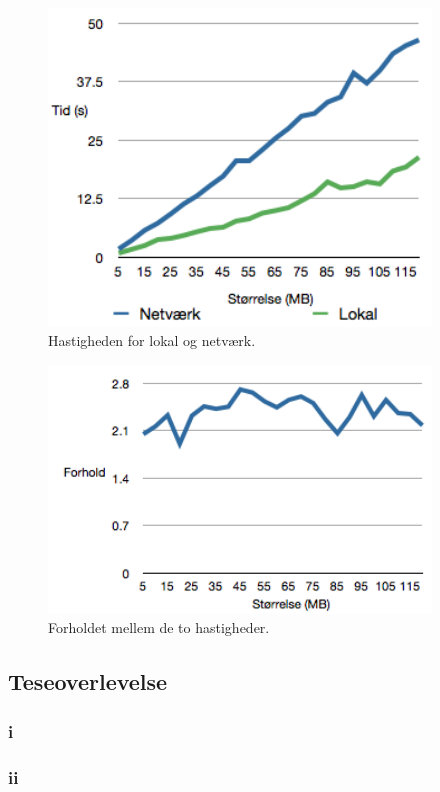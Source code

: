 \documentclass{article}
\begin{document}
\begin{figure}
	\includegraphics[width=4in]{ploto.png}
	\caption{Hastigheden for lokal og netværk.}
	\label{ploto}
\end{figure}

\begin{figure}
	\includegraphics[width=4in]{plotforhold.png}
	\caption{Forholdet mellem de to hastigheder.}
	\label{plotforhold}
\end{figure}

\subsection{Teseoverlevelse}

\subsubsection{i}

\subsubsection{ii}
\end{document}
